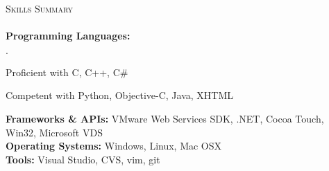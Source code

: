 \documentclass[11pt]{article}
\newcommand{\mydot}{$\cdot$ }
\newcommand{\lineunder}{\vspace*{-8pt} \\ \hspace*{-18pt} \hrulefill \\}
\newcommand{\header}[1]{{\hspace*{-15pt}\vspace*{6pt} \textsc{#1}} \vspace*{-6pt} \lineunder}
\newenvironment{achievements}{\begin{list}{\mydot}{\topsep 0pt \itemsep -2pt}}{\vspace*{4pt}\end{list}}
\begin{document}

\header{Skills Summary}
\textbf{Programming Languages:} 
\begin{achievements}
  \item Proficient with C, C++, C\#
  \item Competent with Python, Objective-C, Java, XHTML
\end{achievements}
\vspace{-3pt}

\textbf{Frameworks \& APIs:} VMware Web Services SDK, .NET, Cocoa Touch, Win32, Microsoft VDS\\

\textbf{Operating Systems:} Windows, Linux, Mac OSX\\

\textbf{Tools:} Visual Studio, CVS, vim, git\\
\end{document}
